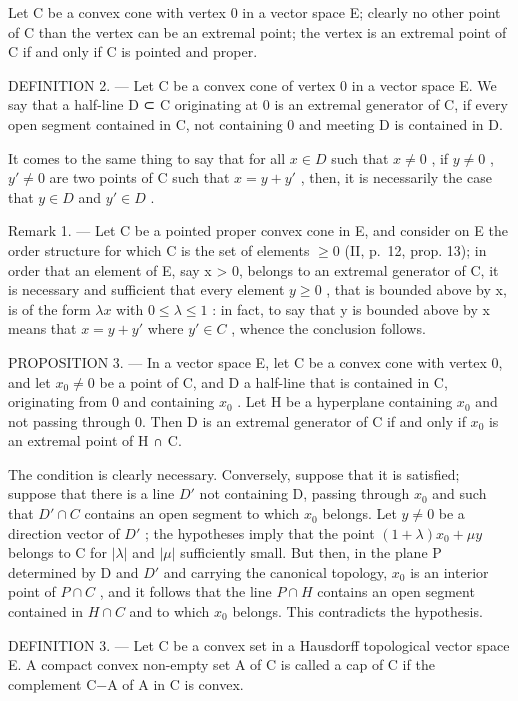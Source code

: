 Let C be a convex cone with vertex 0 in a vector space E; clearly no other point of C than the vertex can be an extremal point; the vertex is an extremal point of C if and only if C is pointed and proper.

DEFINITION 2. --- Let C be a convex cone of vertex 0 in a vector space E. We say that a half-line D ⊂ C originating at 0 is an extremal generator of C, if every open segment contained in C, not containing 0 and meeting D is contained in D.

It comes to the same thing to say that for all \(x \in D\) such that \(x \neq 0\) , if \(y \neq 0\) , \(y' \neq 0\) are two points of C such that \(x = y + y'\) , then, it is necessarily the case that \(y \in D\) and \(y' \in D\) .

Remark 1. --- Let C be a pointed proper convex cone in E, and consider on E the order structure for which C is the set of elements \(\geqslant 0\) (II, p.~12, prop. 13); in order that an element of E, say x \textgreater{} 0, belongs to an extremal generator of C, it is necessary and sufficient that every element \(y \geqslant 0\) , that is bounded above by x, is of the form \(\lambda x\) with \(0 \leqslant \lambda \leqslant 1\) : in fact, to say that y is bounded above by x means that \(x = y + y'\) where \(y' \in C\) , whence the conclusion follows.

PROPOSITION 3. --- In a vector space E, let C be a convex cone with vertex 0, and let \(x_{0} \neq 0\) be a point of C, and D a half-line that is contained in C, originating from 0 and containing \(x_{0}\) . Let H be a hyperplane containing \(x_{0}\) and not passing through 0. Then D is an extremal generator of C if and only if \(x_{0}\) is an extremal point of H ∩ C.

The condition is clearly necessary. Conversely, suppose that it is satisfied; suppose that there is a line \(D'\) not containing D, passing through \(x_{0}\) and such that \(D' \cap C\) contains an open segment to which \(x_{0}\) belongs. Let \(y \neq 0\) be a direction vector of \(D'\) ; the hypotheses imply that the point \((1 + \lambda)x_{0} + \mu y\) belongs to C for \(|\lambda|\) and \(|\mu|\) sufficiently small. But then, in the plane P determined by D and \(D'\) and carrying the canonical topology, \(x_{0}\) is an interior point of \(P \cap C\) , and it follows that the line \(P \cap H\) contains an open segment contained in \(H \cap C\) and to which \(x_{0}\) belongs. This contradicts the hypothesis.

DEFINITION 3. --- Let C be a convex set in a Hausdorff topological vector space E. A compact convex non-empty set A of C is called a cap of C if the complement C−A of A in C is convex.

